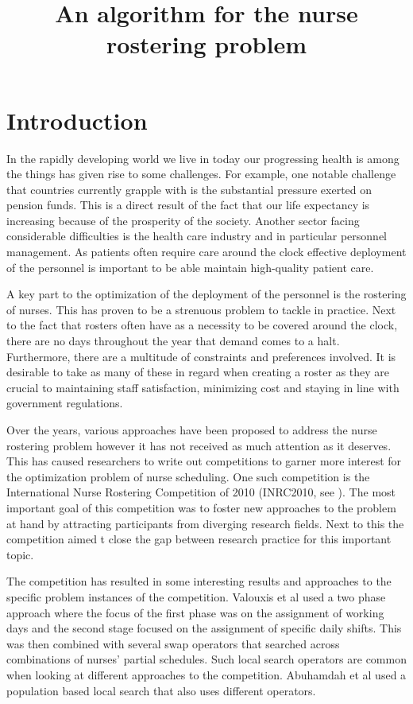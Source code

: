 \documentclass{article}
\title{An algorithm for the nurse rostering problem}
\begin{document}
\maketitle

\section{Introduction}

In the rapidly developing world we live in today our progressing health is among the things has given rise to some challenges.
For example, one notable challenge that countries currently grapple with is the substantial pressure exerted on pension funds.
This is a direct result of the fact that our life expectancy is increasing because of the prosperity of the society.
Another sector facing considerable difficulties is the health care industry and in particular personnel management.
As patients often require care around the clock effective deployment of the personnel is important to be able maintain high-quality patient care.

A key part to the optimization of the deployment of the personnel is the rostering of nurses.
This has proven to be a strenuous problem to tackle in practice.
Next to the fact that rosters often have as a necessity to be covered around the clock, there are no days throughout the year that demand comes to a halt.
Furthermore, there are a multitude of constraints and preferences involved.
It is desirable to take as many of these in regard when creating a roster as they are crucial to maintaining staff satisfaction, minimizing cost and staying in line with government regulations.

Over the years, various approaches have been proposed to address the nurse rostering problem however it has not received as much attention as it deserves.
This has caused researchers to write out competitions to garner more interest for the optimization problem of nurse scheduling.
One such competition is the International Nurse Rostering Competition of 2010 (INRC2010, see \cite{inrc}).
The most important goal of this competition was to foster new approaches to the problem at hand by attracting participants from diverging research fields.
Next to this the competition aimed t close the gap between research practice for this important topic.

The competition has resulted in some interesting results and approaches to the specific problem instances of the competition.
Valouxis et al used a two phase approach where the focus of the first phase was on the assignment of working days and the second stage focused on the assignment of specific daily shifts.
This was then combined with several swap operators that searched across combinations of nurses' partial schedules.
Such local search operators are common when looking at different approaches to the competition.
Abuhamdah et al used a population based local search that also uses different operators.
\end{document}
